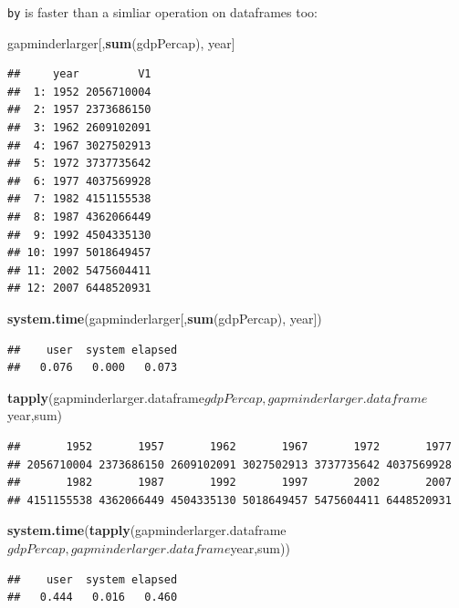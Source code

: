 \documentclass[]{article}
\newenvironment{Shaded}{\begin{snugshade}}{\end{snugshade}}
\newcommand{\KeywordTok}[1]{\textcolor[rgb]{0.13,0.29,0.53}{\textbf{{#1}}}}
\newcommand{\NormalTok}[1]{{#1}}
\begin{document}
\texttt{by} is faster than a simliar operation on dataframes too:

\begin{Shaded}
\begin{Highlighting}[]
\NormalTok{gapminderlarger[,}\KeywordTok{sum}\NormalTok{(gdpPercap), year]}
\end{Highlighting}
\end{Shaded}

\begin{verbatim}
##     year         V1
##  1: 1952 2056710004
##  2: 1957 2373686150
##  3: 1962 2609102091
##  4: 1967 3027502913
##  5: 1972 3737735642
##  6: 1977 4037569928
##  7: 1982 4151155538
##  8: 1987 4362066449
##  9: 1992 4504335130
## 10: 1997 5018649457
## 11: 2002 5475604411
## 12: 2007 6448520931
\end{verbatim}

\begin{Shaded}
\begin{Highlighting}[]
\KeywordTok{system.time}\NormalTok{(gapminderlarger[,}\KeywordTok{sum}\NormalTok{(gdpPercap), year])}
\end{Highlighting}
\end{Shaded}

\begin{verbatim}
##    user  system elapsed 
##   0.076   0.000   0.073
\end{verbatim}

\begin{Shaded}
\begin{Highlighting}[]
\KeywordTok{tapply}\NormalTok{(gapminderlarger.dataframe$gdpPercap,gapminderlarger.dataframe$year,sum)}
\end{Highlighting}
\end{Shaded}

\begin{verbatim}
##       1952       1957       1962       1967       1972       1977 
## 2056710004 2373686150 2609102091 3027502913 3737735642 4037569928 
##       1982       1987       1992       1997       2002       2007 
## 4151155538 4362066449 4504335130 5018649457 5475604411 6448520931
\end{verbatim}

\begin{Shaded}
\begin{Highlighting}[]
\KeywordTok{system.time}\NormalTok{(}\KeywordTok{tapply}\NormalTok{(gapminderlarger.dataframe$gdpPercap,gapminderlarger.dataframe$year,sum))}
\end{Highlighting}
\end{Shaded}

\begin{verbatim}
##    user  system elapsed 
##   0.444   0.016   0.460
\end{verbatim}
\end{document}
